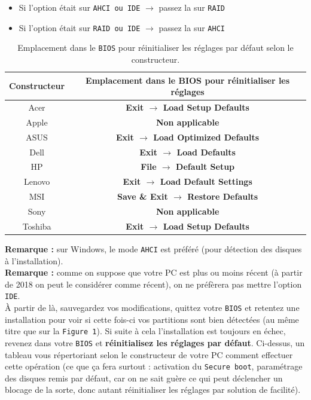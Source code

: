 \documentclass[french, a4paper, 11pt]{article}
\begin{document}
\begin{itemize}
\item Si l'option était sur \texttt{AHCI ou IDE} $\rightarrow$ passez la sur \texttt{RAID}
\item Si l'option était sur \texttt{RAID ou IDE} $\rightarrow$ passez la sur \texttt{AHCI}
\end{itemize}
\begin{table}[ht]
    \centering
    \begin{tabular}{|c|>{\bfseries}c|}
        \hline
        \textbf{Constructeur} & \textbf{Emplacement dans le BIOS pour réinitialiser les réglages} \\
        \hline
        Acer & Exit $\rightarrow$ Load Setup Defaults \\
        Apple & Non applicable \\
        ASUS & Exit $\rightarrow$ Load Optimized Defaults \\
        Dell & Exit $\rightarrow$ Load Defaults \\
        HP & File $\rightarrow$ Default Setup \\
        Lenovo & Exit $\rightarrow$ Load Default Settings \\
        MSI & Save \& Exit $\rightarrow$ Restore Defaults \\
        Sony & Non applicable \\
        Toshiba & Exit $\rightarrow$ Load Setup Defaults \\
        \hline
    \end{tabular}
    \caption{Emplacement dans le \texttt{BIOS} pour réinitialiser les réglages par défaut selon le constructeur.}
    \label{tab:reset-bios-location}
\end{table}
\noindent \textbf{Remarque :} sur Windows, le mode \texttt{AHCI} est préféré (pour détection des disques à l'installation).\\
\textbf{Remarque :} comme on suppose que votre PC est plus ou moins récent (à partir de 2018 on peut le considérer comme récent), on ne préfèrera pas mettre l'option \texttt{IDE}.\\
\noindent À partir de là, sauvegardez vos modifications, quittez votre \texttt{BIOS} et retentez une installation pour voir si cette fois-ci vos partitions sont bien détectées (au même titre que sur la \texttt{Figure 1}). Si suite à cela l'installation est toujours en échec, revenez dans votre \texttt{BIOS} et \textbf{réinitialisez les réglages par défaut}. Ci-dessus, un tableau vous répertoriant selon le constructeur de votre PC comment effectuer cette opération (ce que ça fera surtout : activation du \texttt{Secure boot}, paramétrage des disques remis par défaut, car on ne sait guère ce qui peut déclencher un blocage de la sorte, donc autant réinitialiser les réglages par solution de facilité). \\
\end{document}
